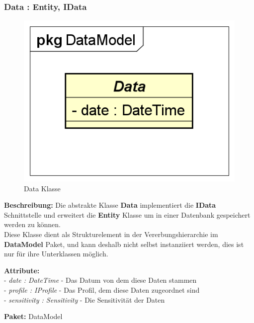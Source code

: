 \documentclass[a4paper]{scrreprt}
\begin{document}
\subsubsection{Data : Entity, IData}
\begin{figure}[H]
\centering
\includegraphics[width=0.75\textheight]{graphics/Klassendiagramme/Model/Data.png}
\caption{Data Klasse}
\end{figure}
\textbf{Beschreibung:} Die abstrakte Klasse \textbf{Data} implementiert die \textbf{IData} Schnittstelle und erweitert die \textbf{Entity} Klasse um in einer Datenbank gespeichert werden zu können.\\
Diese Klasse dient als Strukturelement in der Vererbungshierarchie im \textbf{DataModel} Paket, und kann deshalb nicht selbst instanziiert werden, dies ist nur für ihre Unterklassen möglich.

\textbf{Attribute:}\\
- \textit{date : DateTime} - Das Datum von dem diese Daten stammen\\
- \textit{profile : IProfile} - Das Profil, dem diese Daten zugeordnet sind\\
- \textit{sensitivity : Sensitivity} - Die Sensitivität der Daten

\textbf{Paket:} DataModel
\end{document}
